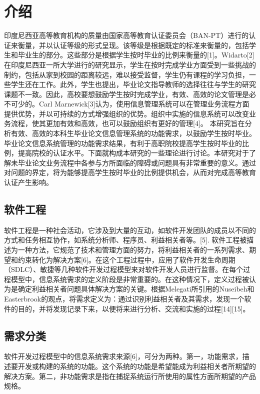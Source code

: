 
\chapter{介绍}
\label{介绍}

印度尼西亚高等教育机构的质量由国家高等教育认证委员会（BAN-PT）进行的认证来衡量，并以认证等级的形式呈现。该等级是根据既定的标准来衡量的，包括学生和毕业生的部分。这些部分是根据学生按时毕业的比例来衡量的[1]。Widarto[2]在印度尼西亚一所大学进行的研究显示，学生在按时完成学业方面受到一些挑战的制约，包括从家到校园的距离较远，难以接受监督，学生仍有课程的学习负担，一些学生还在工作。此外，学生也提出，毕业论文指导教师的选择往往与学生的研究课题不一致。因此，高校要想鼓励学生按时完成学业，有效、高效的论文管理是必不可少的。Carl Marnewick[3]认为，使用信息管理系统可以在管理业务流程方面提供优势，并以可持续的方式增强组织的优势。组织中实施的信息系统可以改变业务流程，使其更加有效和高效，也可以鼓励组织有更好的管理[4]。
本研究旨在分析有效、高效的本科生毕业论文信息管理系统的功能需求，以鼓励学生按时毕业。毕业论文信息系统管理的功能需求结果，有利于高职院校提高学生按时毕业的比例，提高院校的认证水平。下面就构成本研究的一些理论进行讨论。本研究对于了解未毕业论文业务流程中各参与方所面临的障碍或问题具有非常重要的意义。通过对问题的界定，将为能够提高学生按时毕业的比例提供机会，从而对完成高等教育认证产生影响。

\section{软件工程}

软件工程是一种社会活动，它涉及到大量的互动，如软件开发团队的成员以不同的方式和任务相互协作，如系统分析师、程序员、利益相关者等。[5]. 软件工程被描述为一种方法，它规范了技术和管理方面的努力，将利益相关者的一系列需求、期望和约束转化为解决方案[6]。在这个工程过程中，应用了软件开发生命周期（SDLC）、敏捷等几种软件开发过程模型来对软件开发人员进行监督。在每个过程模型中，信息系统需求的定义阶段是非常重要的。在这种情况下，定义过程被认为是确定利益相关者问题具体解决方案的关键。根据Melegati所引用的Nuseibeh和Easterbrook的观点，将需求定义为：通过识别利益相关者及其需求，发现一个软件的目的，并将发现记录下来，以便将来进行分析、交流和实施的过程[14][15]。

\section{需求分类}

软件开发过程模型中的信息系统需求来源[6]，可分为两种。第一，功能需求，描述要开发或构建的系统的功能。这个系统的功能是希望能成为利益相关者所期望的解决方案。第二，非功能需求是指在捕捉系统运行所使用的属性方面所期望的产品规格。

